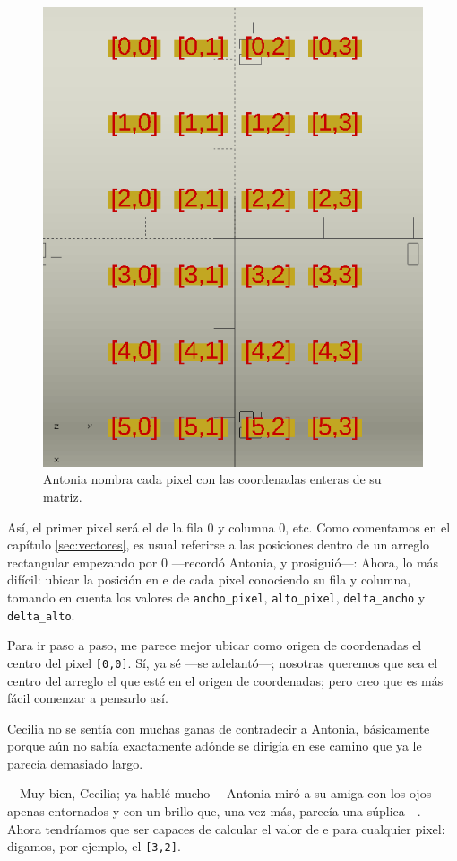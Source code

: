 \begin{figure}[ht]
  \centering
  \includegraphics[width=.45\textwidth]{imagenes/matriz-anotada-coordenadas}
  \caption{Antonia nombra cada pixel con las coordenadas enteras de su
    matriz.}
  \label{fig:matriz-anotada-coordenadas}
\end{figure}
  


\guillemotright Así, el primer pixel será el de la fila 0 y columna 0,
etc. Como comentamos en el capítulo \ref{sec:vectores}, es usual
referirse a las posiciones dentro de un arreglo rectangular empezando
por 0 ---recordó Antonia, y prosiguió---: Ahora, lo más difícil:
ubicar la posición en  e  de cada pixel conociendo
su fila y columna, tomando en cuenta los valores de
\texttt{ancho\_pixel}, \texttt{alto\_pixel}, \texttt{delta\_ancho} y
\texttt{delta\_alto}.


\guillemotright Para ir paso a paso, me parece mejor ubicar como
origen de coordenadas el centro del pixel \texttt{[0,0]}. Sí, ya sé
---se adelantó---; nosotras queremos que sea el centro del arreglo el
que esté en el origen de coordenadas; pero creo que es más fácil
comenzar a pensarlo así.

Cecilia no se sentía con muchas ganas de contradecir a Antonia,
básicamente porque aún no sabía exactamente adónde se dirigía en ese
camino que ya le parecía demasiado largo.

---Muy bien, Cecilia; ya hablé mucho ---Antonia miró a su amiga con
los ojos apenas entornados y con un brillo que, una vez más, parecía
una súplica---. Ahora tendríamos que ser capaces de calcular el valor
de  e  para cualquier pixel: digamos, por ejemplo,
el \texttt{[3,2]}.



